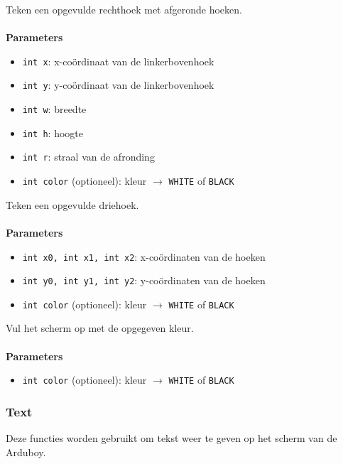 \documentclass[11pt,fleqn]{book} %
\begin{document}
\pagebreak

\begin{libf}[fillRoundRect(x, y, w, h, r, \emph{color=WHITE})]
	Teken een opgevulde rechthoek met afgeronde hoeken.\\ \\
	\textbf{Parameters}
	\begin{itemize}
		\item \texttt{int x}: x-coördinaat van de linkerbovenhoek
		\item \texttt{int y}: y-coördinaat van de linkerbovenhoek
		\item \texttt{int w}: breedte
		\item \texttt{int h}: hoogte
		\item \texttt{int r}: straal van de afronding
		\item \texttt{int color} (optioneel): kleur $\rightarrow$ \texttt{WHITE} of \texttt{BLACK}
	\end{itemize}
\end{libf}

\begin{libf}[fillTriangle(x0, y0, x1, y1, x2, y2, \emph{color=WHITE})]
	Teken een opgevulde driehoek.\\ \\
	\textbf{Parameters}
	\begin{itemize}
		\item \texttt{int x0, int x1, int x2}: x-coördinaten van de hoeken
		\item \texttt{int y0, int y1, int y2}: y-coördinaten van de hoeken
		\item \texttt{int color} (optioneel): kleur $\rightarrow$ \texttt{WHITE} of \texttt{BLACK}
	\end{itemize}
\end{libf}

\begin{libf}[fillScreen(\emph{color=WHITE})]
	Vul het scherm op met de opgegeven kleur.\\ \\
	\textbf{Parameters}
	\begin{itemize}
		\item \texttt{int color} (optioneel): kleur $\rightarrow$ \texttt{WHITE} of \texttt{BLACK}
	\end{itemize}
\end{libf}

\subsubsection{Text}
Deze functies worden gebruikt om tekst weer te geven op het scherm van de Arduboy.
\end{document}
